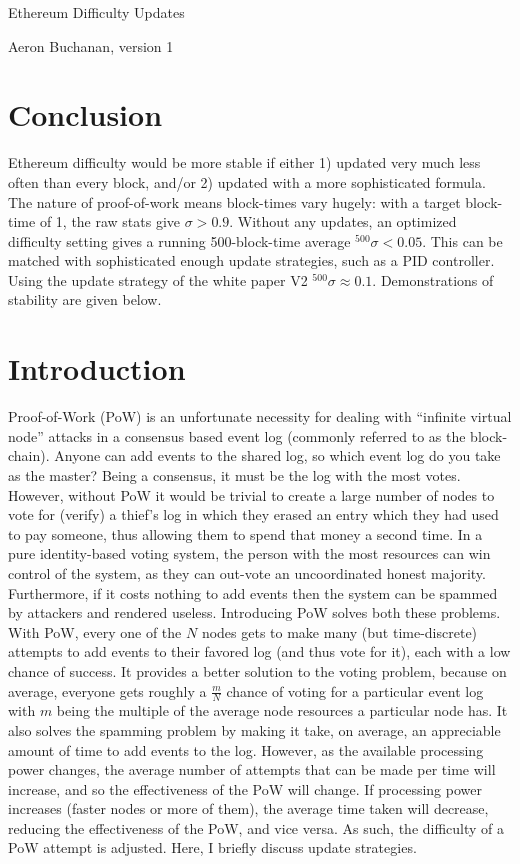 \documentclass[10pt,a4paper]{article}
\begin{document}
\begin{center}
{\huge Ethereum Difficulty Updates}

{\small Aeron Buchanan, version 1}
\end{center} 

\section*{Conclusion}
Ethereum difficulty would be more stable if either 1) updated very much less often than every block, and/or 2) updated with a more sophisticated formula. The nature of proof-of-work means block-times vary hugely: with a target block-time of 1, the raw stats give $\sigma>0.9$. Without any updates, an optimized difficulty setting gives a running 500-block-time average $^{500}\sigma<0.05$. This can be matched with sophisticated enough update strategies, such as a PID controller. Using the update strategy of the white paper V2 $^{500}\sigma\approx0.1$. Demonstrations of stability are given below. 

\section*{Introduction}

Proof-of-Work (PoW) is an unfortunate necessity for dealing with ``infinite virtual node'' attacks in a consensus based event log (commonly referred to as the block-chain). Anyone can add events to the shared log, so which event log do you take as the master? Being a consensus, it must be the log with the most votes. However, without PoW it would be trivial to create a large number of nodes to vote for (verify) a thief's log in which they erased an entry which they had used to pay someone, thus allowing them to spend that money a second time. In a pure identity-based voting system, the person with the most resources can win control of the system, as they can out-vote an uncoordinated honest majority. Furthermore, if it costs nothing to add events then the system can be spammed by attackers and rendered useless. Introducing PoW solves both these problems. With PoW, every one of the $N$ nodes gets to make many (but time-discrete) attempts to add events to their favored log (and thus vote for it), each with a low chance of success. It provides a better solution to the voting problem, because on average, everyone gets roughly a $\frac{m}{N}$ chance of voting for a particular event log with $m$ being the multiple of the average node resources a particular node has. It also solves the spamming problem by making it take, on average, an appreciable amount of time to add events to the log. However, as the available processing power changes, the average number of attempts that can be made per time will increase, and so the effectiveness of the PoW will change. If processing power increases (faster nodes or more of them), the average time taken will decrease, reducing the effectiveness of the PoW, and vice versa. As such, the difficulty of a PoW attempt is adjusted. Here, I briefly discuss update strategies.
\end{document}
